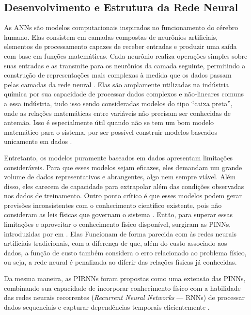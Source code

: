 

\subsection{Desenvolvimento e Estrutura da Rede Neural}

As ANNs são modelos computacionais inspirados no funcionamento do cérebro humano. Elas consistem em camadas compostas de neurônios artificiais, elementos de processamento capazes de receber entradas e produzir uma saída com base em funções matemáticas. Cada neurônio realiza operações simples sobre suas entradas e as transmite para os neurônios da camada seguinte, permitindo a construção de representações mais complexas à medida que os dados passam pelas camadas da rede neural \citep{mu_sun_2022}. Elas são amplamente utilizadas na indústria química por sua capacidade de processar dados complexos e não-lineares comuns a essa indústria, tudo isso sendo consideradas modelos do tipo ``caixa preta'', onde as relações matemáticas entre variáveis não precisam ser conhecidas de antemão. Isso é especialmente útil quando não se tem um bom modelo matemático para o sistema, por ser possível construir modelos baseados unicamente em dados \citep{wang_2022}.

Entretanto, os modelos puramente baseados em dados apresentam limitações consideráveis. Para que esses modelos sejam eficazes, eles demandam um grande volume de dados representativos e abrangentes, algo nem sempre viável. Além disso, eles carecem de capacidade para extrapolar além das condições observadas nos dados de treinamento. Outro ponto crítico é que esses modelos podem gerar previsões inconsistentes com o conhecimento científico existente, pois não consideram as leis físicas que governam o sistema \citep{karniadakis_2021}. Então, para superar essas limitações e aproveitar o conhecimento físico disponível, surgiram as PINNs, introduzidas por \citeauthor{raissi_2017_I} em \citeyear{raissi_2017_I}. Elas Funcionam de forma parecida com às redes neurais artificiais tradicionais, com a diferença de que, além do custo associado aos dados, a função de custo também considera o erro relacionado ao problema físico, ou seja, a rede neural é penalizada ao diferir das relações físicas já conhecidas.

Da mesma maneira, as PIRNNs foram propostas como uma extensão das PINNs, combinando sua capacidade de incorporar conhecimento físico com a habilidade das redes neurais recorrentes (\textit{Recurrent Neural Networks} — RNNs) de processar dados sequenciais e capturar dependências temporais eficientemente \citep{zheng_2023}.

